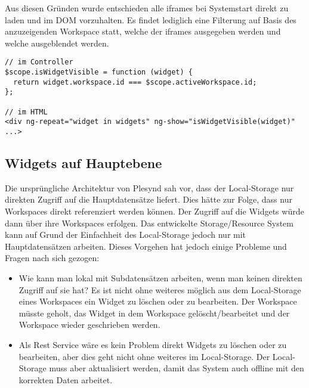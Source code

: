 Aus diesen Gründen wurde entschieden alle iframes bei Systemstart direkt zu laden und im DOM vorzuhalten. Es findet lediglich eine Filterung auf Basis des anzuzeigenden Workspace statt, welche der iframes ausgegeben werden und welche ausgeblendet werden.
\begin{lstlisting}
// im Controller
$scope.isWidgetVisible = function (widget) {
  return widget.workspace.id === $scope.activeWorkspace.id;
};

// im HTML
<div ng-repeat="widget in widgets" ng-show="isWidgetVisible(widget)" ...>
\end{lstlisting}

\subsection{Widgets auf Hauptebene}
Die ursprüngliche Architektur von Plesynd sah vor, dass der Local-Storage nur direkten Zugriff auf die Hauptdatensätze liefert. Dies hätte zur Folge, dass nur Workspaces direkt referenziert werden können. Der Zugriff auf die Widgets würde dann über ihre Workspaces erfolgen. Das entwickelte Storage/Resource System kann auf Grund der Einfachheit des Local-Storage jedoch nur mit Hauptdatensätzen arbeiten. Dieses Vorgehen hat jedoch einige Probleme und Fragen nach sich gezogen: 
\begin{itemize}
 \item Wie kann man lokal mit Subdatensätzen arbeiten, wenn man keinen direkten Zugriff auf sie hat? Es ist nicht ohne weiteres möglich aus dem Local-Storage eines Workspaces ein Widget zu löschen oder zu bearbeiten. Der Workspace müsste geholt, das Widget in dem Workspace gelöscht/bearbeitet und der Workspace wieder geschrieben werden. 
 \item Als Rest Service wäre es kein Problem direkt Widgets zu löschen oder zu bearbeiten, aber dies geht nicht ohne weiteres im Local-Storage. Der Local-Storage muss aber aktualisiert werden, damit das System auch offline mit den korrekten Daten arbeitet.
\end{itemize} 

